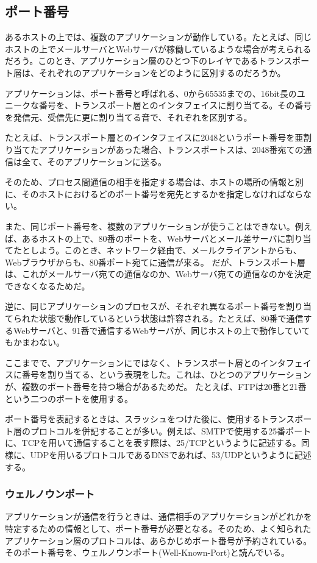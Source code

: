 \subsection{ポート番号}
あるホストの上では、複数のアプリケーションが動作している。たとえば、同じホストの上でメールサーバとWebサーバが稼働しているような場合が考えられるだろう。このとき、アプリケーション層のひとつ下のレイヤであるトランスポート層は、それぞれのアプリケーションをどのように区別するのだろうか。

アプリケーションは、ポート番号と呼ばれる、0から65535までの、16bit長のユニークな番号を、トランスポート層とのインタフェイスに割り当てる。その番号を発信元、受信先に更に割り当てる音で、それぞれを区別する。

たとえば、トランスポート層とのインタフェイスに2048というポート番号を亜割り当てたアプリケーションがあった場合、トランスポートスは、2048番宛ての通信は全て、そのアプリケーションに送る。

そのため、プロセス間通信の相手を指定する場合は、ホストの場所の情報と別に、そのホストにおけるどのポート番号を宛先とするかを指定しなければならない。

また、同じポート番号を、複数のアプリケーションが使うことはできない。例えば、あるホストの上で、80番のポートを、Webサーバとメール差サーバに割り当てたとしよう。このとき、ネットワーク経由で、メールクライアントからも、Webブラウザからも、80番ポート宛てに通信が来る。
だが、トランスポート層は、これがメールサーバ宛ての通信なのか、Webサーバ宛ての通信なのかを決定できなくなるためだ。

逆に、同じアプリケーションのプロセスが、それぞれ異なるポート番号を割り当てられた状態で動作しているという状態は許容される。たとえば、80番で通信するWebサーバと、91番で通信するWebサーバが、同じホストの上で動作していてもかまわない。

ここまでで、アプリケーションにではなく、トランスポート層とのインタフェイスに番号を割り当てる、という表現をした。これは、ひとつのアプリケーションが、複数のポート番号を持つ場合があるためだ。
たとえば、FTPは20番と21番という二つのポートを使用する。

ポート番号を表記するときは、スラッシュをつけた後に、使用するトランスポート層のプロトコルを併記することが多い。例えば、SMTPで使用する25番ポートに、TCPを用いて通信することを表す際は、25/TCPというように記述する。同様に、UDPを用いるプロトコルであるDNSであれば、53/UDPというように記述する。

\subsubsection{ウェルノウンポート}
アプリケーションが通信を行うときは、通信相手のアプリケ＝ションがどれかを特定するための情報として、ポート番号が必要となる。そのため、よく知られたアプリケーション層のプロトコルは、あらかじめポート番号が予約されている。そのポート番号を、ウェルノウンポート(Well-Known-Port)と読んでいる。


